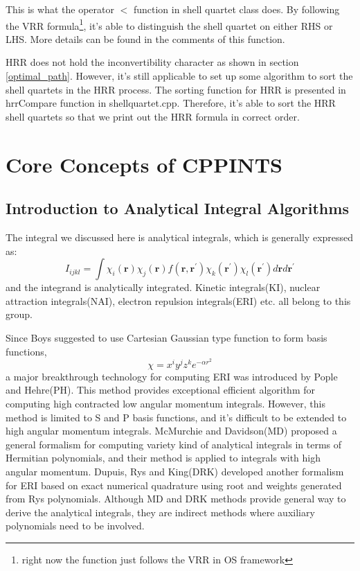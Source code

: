 This is what the operator $<$ function in shell quartet class
does. By following the VRR formula\footnote{right now the function
just follows the VRR in OS framework}, it's able to distinguish
the shell quartet on either RHS or LHS. More details can be 
found in the comments of this function.

HRR does not hold the inconvertibility character as shown in 
section \ref{optimal_path}. However, it's still applicable 
to set up some algorithm to sort the shell quartets in the 
HRR process. The sorting function for HRR is presented in
hrrCompare function in shellquartet.cpp. Therefore, it's 
able to sort the HRR shell quartets so that we print out 
the HRR formula in correct order.


\chapter{Core Concepts of CPPINTS}


\section{Introduction to Analytical Integral Algorithms}
\label{concepts_introduction}

The integral we discussed here is analytical integrals,
which is generally expressed as:
\begin{equation}\label{int_paper:1}
  I_{ijkl} = \int \chi_{i}(\bm{r})\chi_{j}(\bm{r})f(\bm{r},\bm{r^{'}})
\chi_{k}(\bm{r^{'}})\chi_{l}(\bm{r^{'}}) d\bm{r} d\bm{r^{'}}
\end{equation}
and the integrand is analytically integrated. Kinetic integrals(KI),
nuclear attraction integrals(NAI), electron repulsion integrals(ERI) etc. all 
belong to this group. 

Since Boys\cite{SFBoys1950} suggested to use Cartesian Gaussian type function to form 
basis functions,
\begin{equation}\label{int_paper:2}
 \chi = x^{i}y^{j}z^{k}e^{-\alpha r^{2}}
\end{equation}
a major breakthrough technology for computing ERI was introduced by Pople and Hehre(PH)\cite{PH}. 
This method provides exceptional efficient algorithm for computing high contracted 
low angular momentum integrals. However, this method is limited to S and P basis functions, 
and it's difficult to be extended to high angular momentum integrals. McMurchie and 
Davidson(MD)\cite{MD}
proposed a general formalism for computing variety kind of analytical integrals in terms of 
Hermitian polynomials, and their method is applied to integrals with high angular momentum. 
Dupuis, Rys and King(DRK)\cite{DRK1976JCOMP,DRK1976JCP,DRK1983JCOMP} developed another formalism 
for ERI based on exact numerical 
quadrature using root and weights generated from Rys polynomials. Although MD and DRK
methods provide general way to derive the analytical integrals, they are indirect methods where
auxiliary polynomials need to be involved. 

